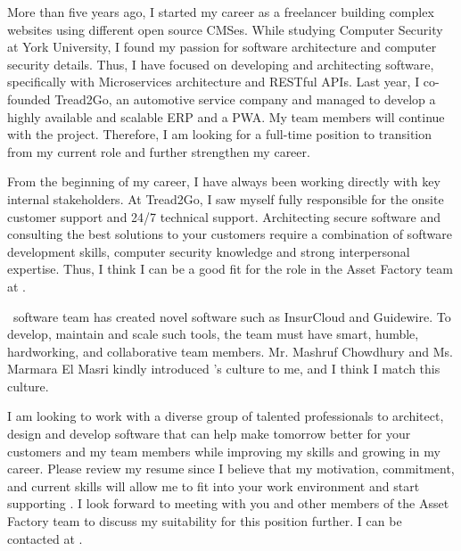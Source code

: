 \documentclass[11pt, a4paper]{awesome-cv}
\begin{document}
\begin{cvletter}
\begin{letterbodyen}
  
  
    More than five years ago, I started my career as a freelancer building complex websites using different open source CMSes. While studying Computer Security at York University, I found my passion for software architecture and computer security details. Thus, I have focused on developing and architecting software, specifically with Microservices architecture and RESTful APIs. Last year, I co-founded Tread2Go, an automotive service company and managed to develop a highly available and scalable ERP and a PWA. My team members will continue with the project. Therefore, I am looking for a full-time position to transition from my current role and further strengthen my career.

    From the beginning of my career, I have always been working directly with key internal stakeholders. At Tread2Go, I saw myself fully responsible for the onsite customer support and 24/7 technical support. Architecting secure software and consulting the best solutions to your customers require a combination of software development skills, computer security knowledge and strong interpersonal expertise. Thus, I think I can be a good fit for the \putposition role in the Asset Factory team at \putcompanyname.
    
    \putcompanyname \ software team has created novel software such as InsurCloud and Guidewire. To develop, maintain and scale such tools, the team must have smart, humble, hardworking, and collaborative team members. Mr. Mashruf Chowdhury and Ms. Marmara El Masri kindly introduced \putcompanyname's culture to me, and I think I match this culture.

    I am looking to work with a diverse group of talented professionals to architect, design and develop software that can help make tomorrow better for your customers and my team members while improving my skills and growing in my career. Please review my resume since I believe that my motivation, commitment, and current skills will allow me to fit into your work environment and start supporting \putcompanyname. I look forward to meeting with you and other members of the Asset Factory team to discuss my suitability for this position further. I can be contacted at \putmobile.  
  
  
  \end{letterbodyen}
\makeletterclosing

\end{cvletter}
\end{document}
